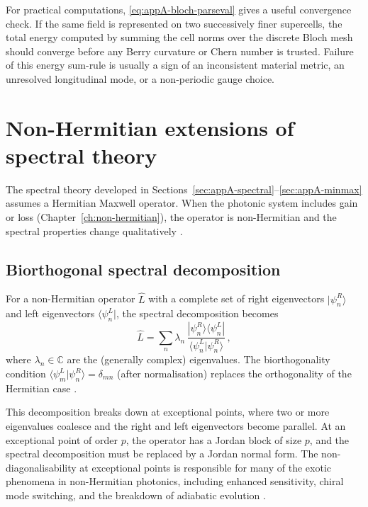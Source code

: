 For practical computations, \eqref{eq:appA-bloch-parseval} gives a
useful convergence check.  If the same field is represented on two
successively finer supercells, the total energy computed by summing the
cell norms over the discrete Bloch mesh should converge before any
Berry curvature or Chern number is trusted.  Failure of this energy
sum-rule is usually a sign of an inconsistent material metric, an
unresolved longitudinal mode, or a non-periodic gauge choice.


\section{Non-Hermitian extensions of spectral theory}
\label{sec:appA-non-hermitian}

The spectral theory developed in
Sections~\ref{sec:appA-spectral}--\ref{sec:appA-minmax} assumes a
Hermitian Maxwell operator.  When the photonic system includes gain
or loss (Chapter~\ref{ch:non-hermitian}), the operator is
non-Hermitian and the spectral properties change qualitatively
\cite{shen2017topological,ding2022non}.

\subsection{Biorthogonal spectral decomposition}
\label{sec:appA-biorthogonal}

For a non-Hermitian operator $\hat{L}$ with a complete set of right
eigenvectors $|\psi_n^R\rangle$ and left eigenvectors
$\langle\psi_n^L|$, the spectral decomposition becomes
\begin{equation}\label{eq:appA-biorthogonal}
  \hat{L} = \sum_n \lambda_n\,
  \frac{|\psi_n^R\rangle\langle\psi_n^L|}
  {\langle\psi_n^L|\psi_n^R\rangle}\,,
\end{equation}
where $\lambda_n\in\mathbb{C}$ are the (generally complex)
eigenvalues.  The biorthogonality condition
$\langle\psi_m^L|\psi_n^R\rangle=\delta_{mn}$ (after normalisation)
replaces the orthogonality of the Hermitian case
\cite{kunst2018biorthogonal}.

This decomposition breaks down at exceptional points, where two or
more eigenvalues coalesce and the right and left eigenvectors become
parallel.  At an exceptional point of order $p$, the operator has a
Jordan block of size $p$, and the spectral decomposition must be
replaced by a Jordan normal form.  The non-diagonalisability at
exceptional points is responsible for many of the exotic phenomena in
non-Hermitian photonics, including enhanced sensitivity, chiral mode
switching, and the breakdown of adiabatic evolution
\cite{ding2022non,kawabata2019classification}.

